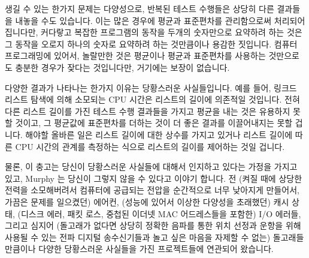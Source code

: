 생길 수 있는 한가지 문제는 다양성으로, 반복된 테스트 수행들은 상당히 다른
결과들을 내놓을 수도 있습니다.
이는 많은 경우에 평균과 표준편차를 관리함으로써 처리되어집니다만, 커다랗고
복잡한 프로그램의 동작을 두개의 숫자만으로 요약하려 하는 것은 그 동작을 오로지
하나의 숫자로 요약하려 하는 것만큼이나 용감한 짓입니다.
컴퓨터 프로그래밍에 있어서, 놀랄만한 것은 평균이나 평균과 표준편차를 사용하는
것만으로도 충분한 경우가 잦다는 것입니다만, 거기에는 보장이 없습니다.

다양한 결과가 나타나는 한가지 이유는 당황스러운 사실들입니다.
예를 들어, 링크드 리스트 탐색에 의해 소모되는 CPU 시간은 리스트의 길이에
의존적일 것입니다.
전혀 다른 리스트 길이를 가진 테스트 수행 결과들을 가지고 평균을 내는 것은
유용하지 못할 것이고, 그 평균값에 표준편차를 더하는 것이 더 좋은 결과를
이끌어내지는 못할 겁니다.
해야할 올바른 일은 리스트 길이에 대한 상수를 가지고 있거나 리스트 길이에 따른
CPU 시간의 관계를 측정하는 식으로 리스트의 길이를 제어하는 것일 겁니다.

물론, 이 충고는 당신이 당황스러운 사실들에 대해서 인지하고 있다는 가정을 가지고
있고, Murphy 는 당신이 그렇지 않을 수 있다고 이야기 합니다.
전 (켜질 때에 상당한 전력을 소모해버려서 컴퓨터에 공급되는 전압을 순간적으로
너무 낮아지게 만들어서, 가끔은 문제를 일으켰던) 에어컨, (성능에 있어서 이상한
다양성을 초래했던) 캐시 상태, (디스크 에러, 패킷 로스, 중첩된 이더넷 MAC
어드레스들을 포함한) I/O 에러들, 그리고 심지어 (돌고래가 없다면 상당히 정확한
음파를 통한 위치 선정과 운항을 위해 사용될 수 있는 전파 디지털 송수신기들과
놀고 싶은 마음을 자제할 수 없는) 돌고래들만큼이나 다양한 당황스러운 사실들을
가진 프로젝트들에 연관되어 왔습니다.
\iffalse


